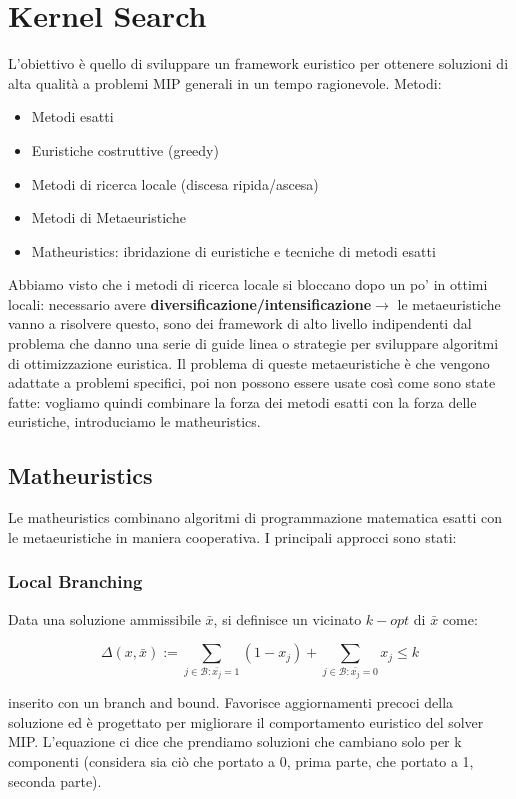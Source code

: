 \section{Kernel Search}
L'obiettivo è quello di sviluppare un framework euristico per ottenere soluzioni di alta qualità a problemi MIP generali in un tempo ragionevole. Metodi:
\begin{itemize}
	\item Metodi esatti
	\item Euristiche costruttive (greedy)
	\item Metodi di ricerca locale (discesa ripida/ascesa)
	\item Metodi di Metaeuristiche
	\item Matheuristics: ibridazione di euristiche e tecniche di metodi esatti
\end{itemize}
Abbiamo visto che i metodi di ricerca locale si bloccano dopo un po' in ottimi locali: necessario avere \textbf{diversificazione/intensificazione}$\rightarrow$ le metaeuristiche vanno a risolvere questo, sono dei framework di alto livello indipendenti dal problema che danno una serie di guide linea o strategie per sviluppare algoritmi di ottimizzazione euristica. Il problema di queste metaeuristiche è che vengono adattate a problemi specifici, poi non possono essere usate così come sono state fatte: vogliamo quindi combinare la forza dei metodi esatti con la forza delle euristiche, introduciamo le matheuristics.
\subsection{\textbf{Matheuristics}}
Le matheuristics combinano algoritmi di programmazione matematica esatti con le metaeuristiche in maniera cooperativa. I principali approcci sono stati:
\subsubsection*{Local Branching}
Data una soluzione ammissibile $\bar{x}$, si definisce un vicinato $k-opt$ di $\bar{x}$ come:
\begin{center}
	\begin{equation*}
		\Delta (x,\bar{x}) := \sum_{j\in \mathcal{B}: \bar{x_j}=1}(1-x_j)+\sum_{j\in \mathcal{B}: \bar{x_j}=0}x_j\le k
	\end{equation*}
\end{center}
inserito con un branch and bound. Favorisce aggiornamenti precoci della soluzione ed è progettato per migliorare il comportamento euristico del solver MIP. L'equazione ci dice che prendiamo soluzioni che cambiano solo per k componenti (considera sia ciò che portato a 0, prima parte, che portato a 1, seconda parte).
